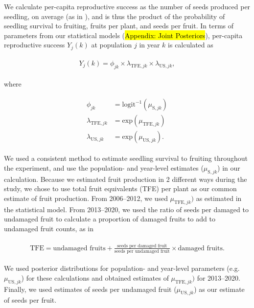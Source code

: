 \documentclass[12pt, oneside, titlepage]{article}   	%
\begin{document}
{We calculate per-capita reproductive success as the number of seeds produced per seedling, on average (as in \cite{venable2007,gremer2014}), and is thus the product of the probability of seedling survival to fruiting, fruits per plant, and seeds per fruit. In terms of parameters from our statistical models (\hl{Appendix: Joint Posteriors}), per-capita reproductive success $Y_{j}(k)$ at population $j$ in year $k$ is calculated as

\begin{align}
  \begin{split}
Y_{j}(k) = \phi_{jk} \times \lambda_{\mathrm{TFE},jk} \times \lambda_{\mathrm{US},jk}, \label{eq:percapitars}
  \end{split}
\end{align}

where

\begin{align}
  \begin{split}
\phi_{jk} & = \mathrm{logit}^{-1}(\mu_{\mathrm{S},jk}) \\
\lambda_{\mathrm{TFE},jk} & = \mathrm{exp}(\mu_{\mathrm{TFE},jk}) \\
\lambda_{\mathrm{US},jk} & = \mathrm{exp}(\mu_{\mathrm{US},jk}). 
  \end{split}
\end{align}

We used a consistent method to estimate seedling survival to fruiting throughout the experiment, and use the population- and year-level estimates ($\mu_{\mathrm{S},jk}$) in our calculation. Because we estimated fruit production in 2 different ways during the study, we chose to use total fruit equivalents (TFE) per plant as our common estimate of fruit production. From 2006--2012, we used $\mu_{\mathrm{TFE},jk})$ as estimated in the statistical model. From 2013--2020, we used the ratio of seeds per damaged to undamaged fruit to calculate a proportion of damaged fruits to add to undamaged fruit counts, as in 

\begin{align}
\begin{split}
\textrm{TFE} = \textrm{undamaged fruits} + \frac{\textrm{seeds per damaged fruit}}{\textrm{seeds per undamaged fruit}}\times  \textrm{damaged fruits} .
  \end{split}
\end{align}

We used posterior distributions for population- and year-level parameters (e.g. $\mu_{\mathrm{US},jk}$) for these calculations and obtained estimates of $\mu_{\mathrm{TFE},jk})$ for 2013--2020. Finally, we used estimates of seeds per undamaged fruit ($\mu_{\mathrm{US},jk}$) as our estimate of seeds per fruit.

}
\end{document}
